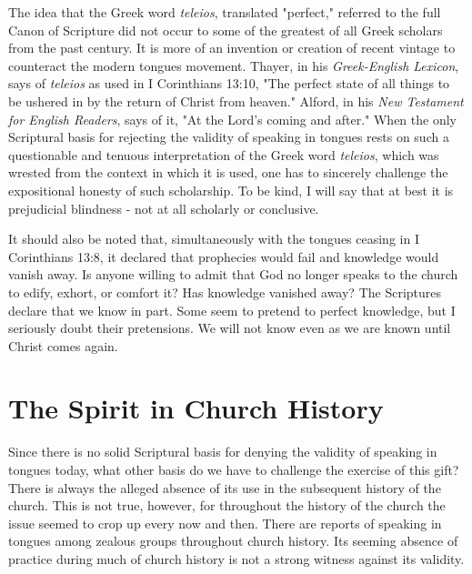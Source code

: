 The idea that the Greek word \emph{teleios}, translated "perfect," referred to the full Canon of Scripture did not occur to some of the greatest of all Greek scholars from the past century. It is more of an invention or creation of recent vintage to counteract the modern tongues movement. Thayer, in his \emph{Greek-English Lexicon}, says of \emph{teleios} as used in I Corinthians 13:10, "The perfect state of all things to be ushered in by the return of Christ from heaven." Alford, in his \emph{New Testament for English Readers}, says of it, "At the Lord's coming and after." When the only Scriptural basis for rejecting the validity of speaking in tongues rests on such a questionable and tenuous interpretation of the Greek word \emph{teleios}, which was wrested from the context in which it is used, one has to sincerely challenge the expositional honesty of such scholarship. To be kind, I will say that at best it is prejudicial blindness - not at all scholarly or conclusive. 

It should also be noted that, simultaneously with the tongues ceasing in I Corinthians 13:8, it declared that prophecies would fail and knowledge would vanish away. Is anyone willing to admit that God no longer speaks to the church to edify, exhort, or comfort it? Has knowledge vanished away? The Scriptures declare that we know in part. Some seem to pretend to perfect knowledge, but I seriously doubt their pretensions. We will not know even as we are known until Christ comes again. 

\section*{The Spirit in Church History}

Since there is no solid Scriptural basis for denying the validity of speaking in tongues today, what other basis do we have to challenge the exercise of this gift? There is always the alleged absence of its use in the subsequent history of the church. This is not true, however, for throughout the history of the church the issue seemed to crop up every now and then. There are reports of speaking in tongues among zealous groups throughout church history. Its seeming absence of practice during much of church history is not a strong witness against its validity. 

